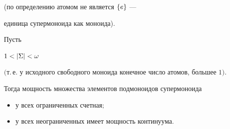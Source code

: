  (по определению атомом не является $\{ e \}$ ---


 единица супермоноида как моноида).





 \begin{props} \label{moshN}


Пусть


$1<|\Sigma|<\om$


$($т.\,е. у исходного свободного моноида конечное число атомов, большее $1)$.


 Тогда мощность множества элементов подмоноидов супермоноида


 \begin{itemize}


 \item[--] у всех ограниченных счетная$;$


 \item[--] у всех неограниченных имеет мощность континуума.


 \end{itemize}


 \end{props}





